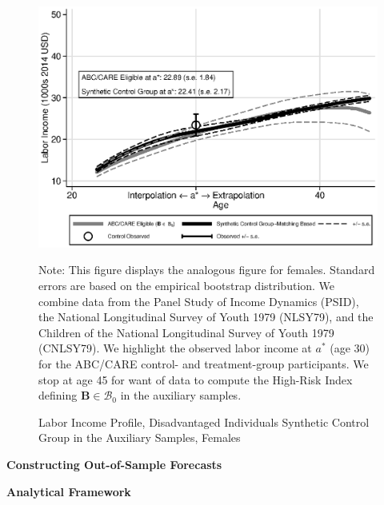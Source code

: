 \documentclass[static]{JJH-Beamer}
\begin{document}
\begin{frame}

\begin{figure}[H]\addtocounter{figure}{-1}
\caption{Labor Income Profile, Disadvantaged Individuals Synthetic Control Group in the Auxiliary Samples, Females}\label{figure:controltests}
\begin{center}
\includegraphics[width=.65\textwidth]{output/abccare_disad_0}
\end{center}
\tiny \flushleft Note: This figure displays the analogous figure for females. Standard errors are based on the empirical bootstrap distribution. We combine data from the Panel Study of Income Dynamics (PSID), the National Longitudinal Survey of Youth 1979 (NLSY79), and the Children of the National Longitudinal Survey of Youth 1979 (CNLSY79). We highlight the observed labor income at $a^*$ (age 30) for the ABC/CARE control- and treatment-group participants. We stop at age 45 for want of data to compute the High-Risk Index defining $\bm{B} \in \mathcal{B}_0$ in the auxiliary samples.\\
\end{figure}

\end{frame}

\begin{frame}

\begin{center}
\textbf{Constructing Out-of-Sample Forecasts}
\end{center}

\end{frame}

\begin{frame}

\begin{center}
\textbf{Analytical Framework}
\end{center}

\end{frame}
\end{document}
